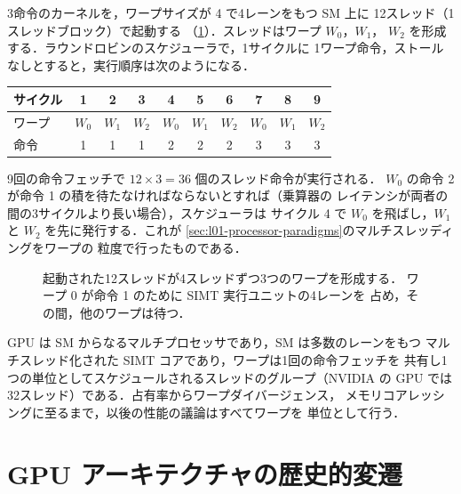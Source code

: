 \documentclass[../main.tex]{subfiles}
\begin{document}
\begin{example}
  \label{ex:l01-warps}
  3命令のカーネルを，ワープサイズが 4 で4レーンをもつ SM 上に
  12スレッド（1スレッドブロック）で起動する
  （\cref{fig:l01-warp-execution}）．スレッドはワープ $W_0$，$W_1$，
  $W_2$ を形成する．ラウンドロビンのスケジューラで，1サイクルに
  1ワープ命令，ストールなしとすると，実行順序は次のようになる．
  \begin{center}
    \begin{tabular}{lccccccccc}
      \toprule
      サイクル & 1 & 2 & 3 & 4 & 5 & 6 & 7 & 8 & 9 \\
      \midrule
      ワープ & $W_0$ & $W_1$ & $W_2$ & $W_0$ & $W_1$ & $W_2$ & $W_0$ & $W_1$ & $W_2$ \\
      命令 & 1 & 1 & 1 & 2 & 2 & 2 & 3 & 3 & 3 \\
      \bottomrule
    \end{tabular}
  \end{center}
  9回の命令フェッチで $12 \times 3 = 36$ 個のスレッド命令が実行される．
  $W_0$ の命令 2 が命令 1 の積を待たなければならないとすれば（乗算器の
  レイテンシが両者の間の3サイクルより長い場合），スケジューラは
  サイクル 4 で $W_0$ を飛ばし，$W_1$ と $W_2$ を先に発行する．これが
  \cref{sec:l01-processor-paradigms}のマルチスレッディングをワープの
  粒度で行ったものである．
\end{example}

\begin{figure}[htbp]
  \centering
  
  \caption{起動された12スレッドが4スレッドずつ3つのワープを形成する．
    ワープ 0 が命令 1 のために SIMT 実行ユニットの4レーンを
    占め，その間，他のワープは待つ．}
  \label{fig:l01-warp-execution}
\end{figure}

\begin{keypoint}
  GPU は SM からなるマルチプロセッサであり，SM は多数のレーンをもつ
  マルチスレッド化された SIMT コアであり，ワープは1回の命令フェッチを
  共有し1つの単位としてスケジュールされるスレッドのグループ（NVIDIA
  の GPU では32スレッド）である．占有率からワープダイバージェンス，
  メモリコアレッシングに至るまで，以後の性能の議論はすべてワープを
  単位として行う．
\end{keypoint}

\section{GPU アーキテクチャの歴史的変遷}
\label{sec:l01-history}
\end{document}
